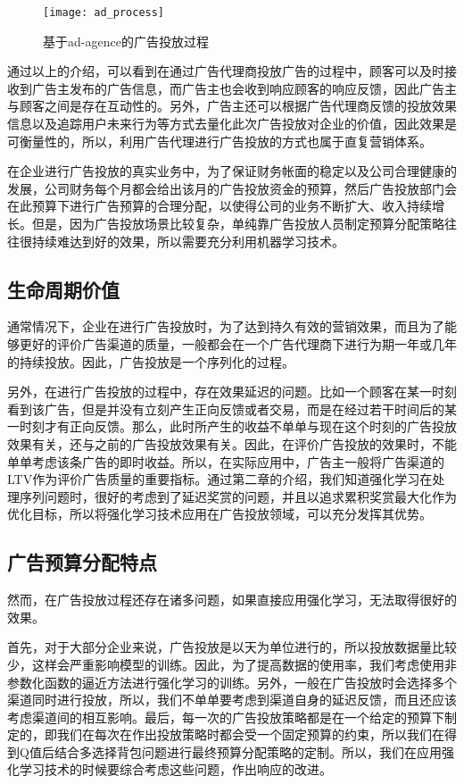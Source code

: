 \begin{figure}[htbp]
\centering
\texttt{[image: ad\_process]}
\caption{基于ad-agence的广告投放过程}
\label{fig:ad_process}
\end{figure}

通过以上的介绍，可以看到在通过广告代理商投放广告的过程中，顾客可以及时接收到广告主发布的广告信息，而广告主也会收到响应顾客的响应反馈，因此广告主与顾客之间是存在互动性的。另外，广告主还可以根据广告代理商反馈的投放效果信息以及追踪用户未来行为等方式去量化此次广告投放对企业的价值，因此效果是可衡量性的，所以，利用广告代理进行广告投放的方式也属于直复营销体系。

在企业进行广告投放的真实业务中，为了保证财务帐面的稳定以及公司合理健康的发展，公司财务每个月都会给出该月的广告投放资金的预算，然后广告投放部门会在此预算下进行广告预算的合理分配，以使得公司的业务不断扩大、收入持续增长。但是，因为广告投放场景比较复杂，单纯靠广告投放人员制定预算分配策略往往很持续难达到好的效果，所以需要充分利用机器学习技术。

\subsection{生命周期价值}
通常情况下，企业在进行广告投放时，为了达到持久有效的营销效果，而且为了能够更好的评价广告渠道的质量，一般都会在一个广告代理商下进行为期一年或几年的持续投放。因此，广告投放是一个序列化的过程。

另外，在进行广告投放的过程中，存在效果延迟的问题。比如一个顾客在某一时刻看到该广告，但是并没有立刻产生正向反馈或者交易，而是在经过若干时间后的某一时刻才有正向反馈。那么，此时所产生的收益不单单与现在这个时刻的广告投放效果有关，还与之前的广告投放效果有关。因此，在评价广告投放的效果时，不能单单考虑该条广告的即时收益。所以，在实际应用中，广告主一般将广告渠道的LTV作为评价广告质量的重要指标。通过第二章的介绍，我们知道强化学习在处理序列问题时，很好的考虑到了延迟奖赏的问题，并且以追求累积奖赏最大化作为优化目标，所以将强化学习技术应用在广告投放领域，可以充分发挥其优势。

\subsection{广告预算分配特点}
然而，在广告投放过程还存在诸多问题，如果直接应用强化学习，无法取得很好的效果。

首先，对于大部分企业来说，广告投放是以天为单位进行的，所以投放数据量比较少，这样会严重影响模型的训练。因此，为了提高数据的使用率，我们考虑使用非参数化函数的逼近方法进行强化学习的训练。另外，一般在广告投放时会选择多个渠道同时进行投放，所以，我们不单单要考虑到渠道自身的延迟反馈，而且还应该考虑渠道间的相互影响。最后，每一次的广告投放策略都是在一个给定的预算下制定的，即我们在每次在作出投放策略时都会受一个固定预算的约束，所以我们在得到Q值后结合多选择背包问题进行最终预算分配策略的定制。所以，我们在应用强化学习技术的时候要综合考虑这些问题，作出响应的改进。

